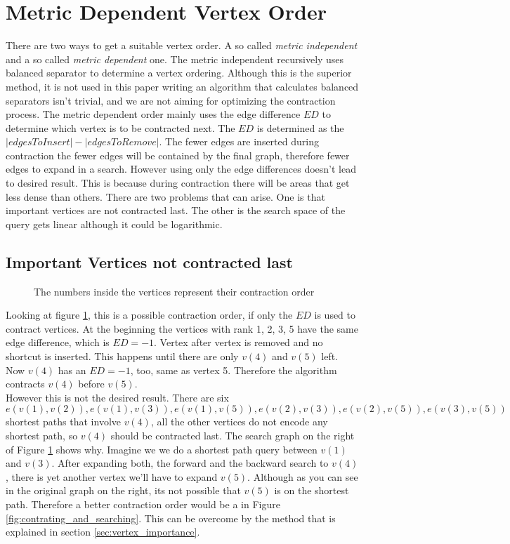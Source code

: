 \section{Metric Dependent Vertex Order}
There are two ways to get a suitable vertex order. A so called \textit{metric independent} and a so called \textit{metric dependent} one. The metric independent recursively uses balanced separator to determine a vertex ordering\cite{CCH}. Although this is the superior method, it is not used in this paper writing an algorithm that calculates balanced separators isn't trivial, and we are not aiming for optimizing the contraction process. 
The metric dependent order mainly uses the edge difference $ED$ to determine which vertex is to be contracted next. The $ED$ is determined as the $|edges To Insert| - |edges To Remove|$. The fewer edges are inserted during contraction the fewer edges will be contained by the final graph, therefore fewer edges to expand in a search. However using only the edge differences doesn't lead to desired result. This is because during contraction there will be areas that get less dense than others. 
There are two problems that can arise. One is that important vertices are not contracted last. The other is the search space of the query gets linear although it could be logarithmic.

\subsection{Important Vertices not contracted last}\label{sec:not_contracted_last}

\begin{figure}
    \centering
    
    \caption{The numbers inside the vertices represent their contraction order}
    \label{fig:not_contracted_last}
\end{figure}

Looking at figure \ref{fig:not_contracted_last}, this is a possible contraction order, if only the $ED$ is used to contract vertices. At the beginning the vertices with rank 1, 2, 3, 5 have the same edge difference, which is $ED = -1$. Vertex after vertex is removed  and  no shortcut is inserted. This happens until there are only $v(4)$ and $v(5)$ left. Now $v(4)$ has an $ED=-1$, too, same as vertex 5. Therefore the algorithm contracts $v(4)$ before $v(5)$. \\
However this is not the desired result. There are six ${e(v(1),v(2)), e(v(1),v(3)), e(v(1),v(5)), e(v(2),v(3)), e(v(2),v(5)), e(v(3),v(5))}$ shortest paths that involve  $v(4)$, all the other vertices do not encode any shortest path, so $v(4)$ should be contracted last. The search graph on the right of Figure \ref{fig:not_contracted_last} shows why. Imagine we we do a shortest path query between $v(1)$ and $v(3)$. After expanding both, the forward and the backward search to $v(4)$, there is yet another vertex we'll have to expand $v(5)$. Although 
as you can see in the original graph on the right, its not possible that $v(5)$ is on the shortest path. Therefore a better contraction order would be a in Figure \ref{fig:contrating_and_searching}.  This can be overcome by the method that is explained in section \ref{sec:vertex_importance}.


